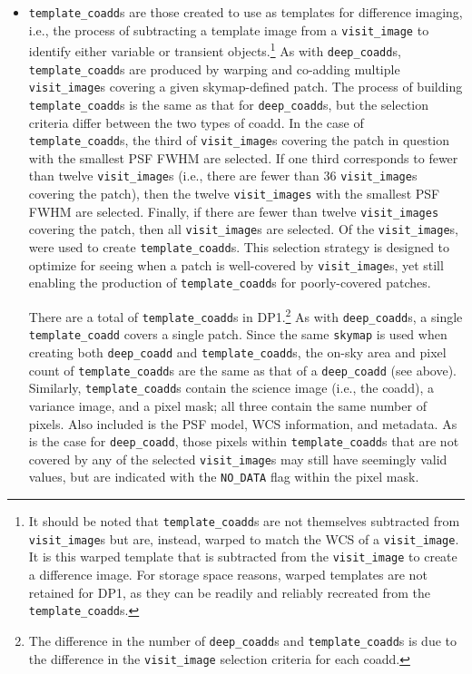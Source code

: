 \begin{itemize}
\item \texttt{template\_coadd}s are those created to use as templates for difference imaging, i.e., the process of subtracting a template image from a \texttt{visit\_image} to identify either variable or \gls{transient} objects.\footnote{It should be noted that \texttt{template\_coadd}s are not themselves subtracted from \texttt{visit\_image}s but are, instead, warped to match the \gls{WCS} of a \texttt{visit\_image}.
It is this warped template that is subtracted from the \texttt{visit\_image} to create a difference image.
For storage space reasons, warped templates are not retained for \gls{DP1}, as they can be readily and reliably recreated from the \texttt{template\_coadd}s.}
As with \texttt{deep\_coadd}s, \texttt{template\_coadd}s are produced by warping and co-adding multiple \texttt{visit\_image}s covering a given skymap-defined \gls{patch}.
The process of building \texttt{template\_coadd}s is the same as that for \texttt{deep\_coadd}s, but the selection criteria differ between the two types of coadd.
In the case of \texttt{template\_coadd}s, the third of \texttt{visit\_image}s covering the \gls{patch} in question with the smallest \gls{PSF} \gls{FWHM} are selected.
If one third corresponds to fewer than twelve \texttt{visit\_image}s (i.e., there are fewer than 36 \texttt{visit\_image}s covering the \gls{patch}), then the twelve \texttt{visit\_images} with the smallest \gls{PSF} \gls{FWHM} are selected.
Finally, if there are fewer than twelve \texttt{visit\_images} covering the \gls{patch}, then all \texttt{visit\_image}s are selected. Of the \nvisitimages \texttt{visit\_image}s, \ntemplatevisitimages were used to create \texttt{template\_coadd}s.
This selection strategy is designed to optimize for \gls{seeing} when a \gls{patch} is well-covered by \texttt{visit\_image}s, yet still enabling the production of \texttt{template\_coadd}s for poorly-covered patches.

There are a total of \ntemplatecoadds \texttt{template\_coadd}s in \gls{DP1}.\footnote{The difference in the number of \texttt{deep\_coadd}s and \texttt{template\_coadd}s is due to the difference in the \texttt{visit\_image} selection criteria for each coadd.}
As with \texttt{deep\_coadd}s, a single \texttt{template\_coadd} covers a single \gls{patch}.
Since the same \texttt{skymap} is used when creating both \texttt{deep\_coadd} and \texttt{template\_coadd}s, the on-sky area and pixel count of \texttt{template\_coadd}s are the same as that of a \texttt{deep\_coadd} (see above).
Similarly, \texttt{template\_coadd}s contain the science image (i.e., the coadd), a variance image, and a pixel mask; all three contain the same number of pixels.
Also included is the \gls{PSF} model, \gls{WCS} information, and \gls{metadata}.
As is the case for \texttt{deep\_coadd}, those pixels within \texttt{template\_coadd}s that are not covered by any of the selected \texttt{visit\_image}s may still have seemingly valid values, but are indicated with the \texttt{NO\_DATA} flag within the pixel mask.


\end{itemize}
